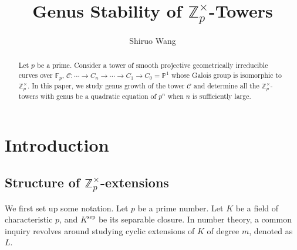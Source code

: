 \documentclass{proc-l}
\theoremstyle{definition}
\theoremstyle{remark}
\numberwithin{equation}{section}
\DeclareMathOperator{\sep}{sep}
\begin{document}
\title{Genus Stability of $\mathbb Z_p^\times$-Towers}


\author{Shiruo Wang}
\address{}
\curraddr{}





\dedicatory{}


\begin{abstract}
Let $p$ be a prime. Consider a tower of smooth projective geometrically irreducible curves over $\mathbb F_p$, $\mathscr C:\cdots\rightarrow C_n\rightarrow\cdots\rightarrow C_1\rightarrow C_0=\mathbb P^1$ whose Galois group is isomorphic to $\mathbb Z_p^\times$. In this paper, we study genus growth of the tower $\mathscr C$ and determine all the $\mathbb Z_p^\times$-towers with genus be a quadratic equation of $p^{n}$ when $n$ is sufficiently large.
\end{abstract}

\maketitle
\section{Introduction}
\subsection{Structure of $\mathbb Z_p^\times$-extensions}
We first set up some notation. Let $p$ be a prime number. Let $K$ be a field of characteristic $p$, and $K^{\sep}$ be its separable closure. In number theory, a common inquiry revolves around studying cyclic extensions of 
$K$ of degree $m$, denoted as $L$.
\end{document}
